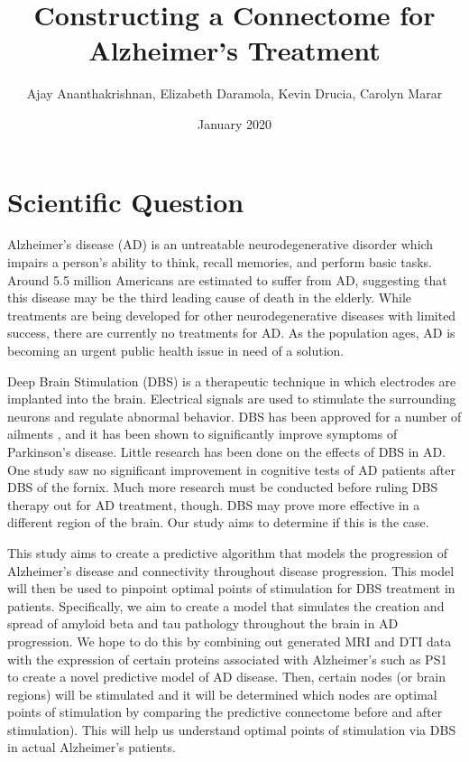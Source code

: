 \documentclass{article}
\title{Constructing a Connectome for Alzheimer's Treatment}
\author{Ajay Ananthakrishnan, Elizabeth Daramola, Kevin Drucia, Carolyn Marar }
\date{January 2020}
\begin{document}
\maketitle

\section{Scientific Question}
Alzheimer's disease (AD) is an untreatable neurodegenerative disorder which impairs a person's ability to think, recall memories, and perform basic tasks. Around 5.5 million Americans are estimated to suffer from AD, suggesting that this disease may be the third leading cause of death in the elderly. \cite{Alzheimer's Facts} While treatments are being developed for other neurodegenerative diseases with limited success, there are currently no treatments for AD. As the population ages, AD is becoming an urgent public health issue in need of a solution.

Deep Brain Stimulation (DBS) is a therapeutic technique in which electrodes are implanted into the brain. Electrical signals are used to stimulate the surrounding neurons and regulate abnormal behavior. DBS has been approved for a number of ailments \cite{DBS uses}, and it has been shown to significantly improve symptoms of Parkinson's disease. \cite{DBS PD} Little research has been done on the effects of DBS in AD. One study saw no significant improvement in cognitive tests of AD patients after DBS of the fornix. \cite{DBS AD} Much more research must be conducted before ruling DBS therapy out for AD treatment, though. DBS may prove more effective in a different region of the brain. Our study aims to determine if this is the case.

This study aims to create a predictive algorithm that models the progression of Alzheimer’s disease and connectivity throughout disease progression. This model will then be used to pinpoint optimal points of stimulation for DBS treatment in patients. Specifically, we aim to create a model that simulates the creation and spread of amyloid beta and tau pathology throughout the brain in AD progression. We hope to do this by combining out generated MRI and DTI data with the expression of certain proteins associated with Alzheimer’s such as PS1 to create a novel predictive model of AD disease. Then, certain nodes (or brain regions) will be stimulated and it will be determined which nodes are optimal points of stimulation by comparing the predictive connectome before and after stimulation). This will help us understand optimal points of stimulation via DBS in actual Alzheimer’s patients.
\end{document}
